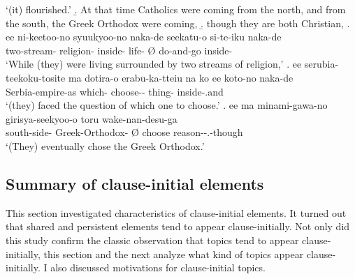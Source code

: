 	`(it) flourished.'
 \b. At that time Catholics were coming from the north, and from the south, the Greek Orthodox were coming,
 \b. though they are both Christian,
 \bg. ee ni-keetoo-no syuukyoo-no naka-de seekatu-o \EM{\O} si-te-iku naka-de \\
 		 two-stream- religion- inside- life- {\O} do-and-go inside- \\
		`While (they) were living surrounded by two streams of religion,'
 \bg. ee serubia-teekoku-tosite ma dotira-o erabu-ka-tteiu na ko ee koto-no naka-de \\
 	 Serbia-empire-as  which- choose--    thing- inside-.and \\
	`(they) faced the question of which one to choose.'
 \bg. ee ma minami-gawa-no girisya-seekyoo-o \EM{\O} toru wake-nan-desu-ga \\
 	  south-side- Greek-Orthodox- {\O} choose reason--.-though \\
	`(They) eventually chose the Greek Orthodox.'


\subsection{Summary of clause-initial elements}

This section investigated characteristics of clause-initial elements.
It turned out that
shared and persistent elements tend to appear clause-initially.
Not only did this study confirm the classic observation that
topics tend to appear clause-initially,
this section and the next  analyze what kind of topics appear clause-initially.
I also discussed motivations for clause-initial topics.


